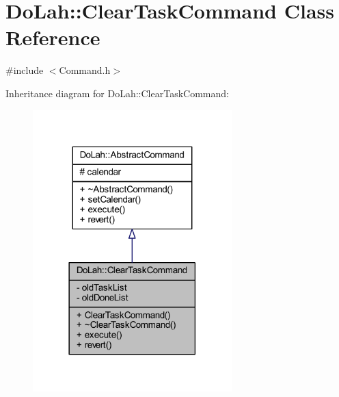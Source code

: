 \hypertarget{class_do_lah_1_1_clear_task_command}{}\section{Do\+Lah\+:\+:Clear\+Task\+Command Class Reference}
\label{class_do_lah_1_1_clear_task_command}


{\ttfamily \#include $<$Command.\+h$>$}



Inheritance diagram for Do\+Lah\+:\+:Clear\+Task\+Command\+:\nopagebreak
\begin{figure}[H]
\begin{center}
\leavevmode
\includegraphics[width=218pt]{class_do_lah_1_1_clear_task_command__inherit__graph}
\end{center}
\end{figure}


